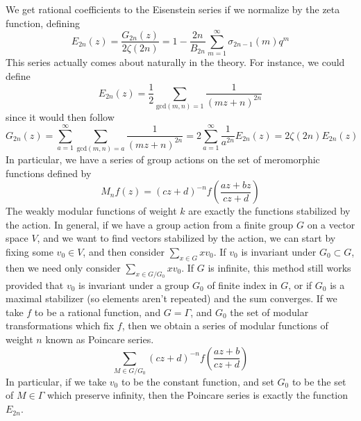 We get rational coefficients to the Eisenstein series if we normalize by the zeta function, defining
%
\[ E_{2n}(z) = \frac{G_{2n}(z)}{2\zeta(2n)} = 1 - \frac{2n}{B_{2n}} \sum_{m = 1}^\infty \sigma_{2n-1}(m) q^m \]
%
This series actually comes about naturally in the theory. For instance, we could define
%
\[ E_{2n}(z) = \frac{1}{2} \sum_{\text{gcd}(m,n) = 1} \frac{1}{(mz + n)^{2n}} \]
%
since it would then follow
%
\[ G_{2n}(z) = \sum_{a = 1}^\infty \sum_{\text{gcd}(m,n) = a} \frac{1}{(mz + n)^{2n}} = 2 \sum_{a = 1}^\infty \frac{1}{a^{2n}} E_{2n}(z) = 2 \zeta(2n) E_{2n}(z) \]
%
In particular, we have a series of group actions on the set of meromorphic functions defined by
%
\[ M_n f (z) = (cz + d)^{-n} f \left(\frac{az + bz}{cz + d} \right) \]
%
The weakly modular functions of weight $k$ are exactly the functions stabilized by the action. In general, if we have a group action from a finite group $G$ on a vector space $V$, and we want to find vectors stabilized by the action, we can start by fixing some $v_0 \in V$, and then consider $\sum_{x \in G} xv_0$. If $v_0$ is invariant under $G_0 \subset G$, then we need only consider $\sum_{x \in G/G_0} xv_0$. If $G$ is infinite, this method still works provided that $v_0$ is invariant under a group $G_0$ of finite index in $G$, or if $G_0$ is a maximal stabilizer (so elements aren't repeated) and the sum converges. If we take $f$ to be a rational function, and $G = \Gamma$, and $G_0$ the set of modular transformations which fix $f$, then we obtain a series of modular functions of weight $n$ known as Poincare series.
%
\[ \sum_{M \in G/G_0} (cz + d)^{-n} f \left( \frac{az + b}{cz + d} \right) \]
%
In particular, if we take $v_0$ to be the constant function, and set $G_0$ to be the set of $M \in \Gamma$ which preserve infinity, then the Poincare series is exactly the function $E_{2n}$.


